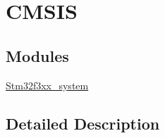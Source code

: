 \hypertarget{group___c_m_s_i_s}{}\section{C\+M\+S\+IS}
\label{group___c_m_s_i_s}
\subsection*{Modules}
\begin{DoxyCompactItemize}
\item 
\mbox{\hyperlink{group__stm32f3xx__system}{Stm32f3xx\+\_\+system}}
\end{DoxyCompactItemize}


\subsection{Detailed Description}
